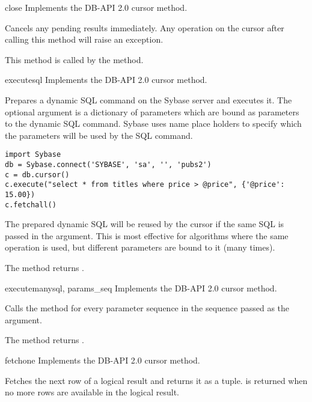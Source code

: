 \begin{methoddesc}[Cursor]{close}{}
Implements the DB-API 2.0 cursor  method.

Cancels any pending results immediately.  Any operation on the cursor
after calling this method will raise an exception.

This method is called by the  method.
\end{methoddesc}

\begin{methoddesc}[Cursor]{execute}{sql }
Implements the DB-API 2.0 cursor  method.

Prepares a dynamic SQL command on the Sybase server and executes it.
The optional  argument is a dictionary of parameters which
are bound as parameters to the dynamic SQL command.  Sybase uses name
place holders to specify which the parameters will be used by the SQL
command.

\begin{verbatim}
import Sybase
db = Sybase.connect('SYBASE', 'sa', '', 'pubs2')
c = db.cursor()
c.execute("select * from titles where price > @price", {'@price': 15.00})
c.fetchall()
\end{verbatim}

The prepared dynamic SQL will be reused by the cursor if the same SQL
is passed in the  argument.  This is most effective for
algorithms where the same operation is used, but different parameters
are bound to it (many times).

The method returns .
\end{methoddesc}

\begin{methoddesc}[Cursor]{executemany}{sql, params_seq}
Implements the DB-API 2.0 cursor  method.

Calls the  method for every parameter sequence in
the sequence passed as the  argument.

The method returns .
\end{methoddesc}

\begin{methoddesc}[Cursor]{fetchone}{}
Implements the DB-API 2.0 cursor  method.

Fetches the next row of a logical result and returns it as a tuple.
 is returned when no more rows are available in the logical
result.
\end{methoddesc}

